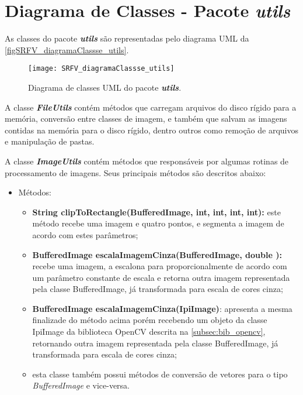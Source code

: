 \section{Diagrama de Classes - Pacote \textit{\textbf{utils}}}\label{sec:ituls}
As classes do pacote \textbf{\textit{utils}} são representadas pelo diagrama UML da \autoref{figSRFV_diagramaClassse_utils}. 

\begin{figure}[h]
	\centering
	\texttt{[image: SRFV\_diagramaClassse\_utils]}
	\caption{Diagrama de classes UML do pacote \textbf{\textit{utils}}.}
	\label{figSRFV_diagramaClassse_utils}
\end{figure}

A classe \textit{\textbf{FileUtils}} contém métodos que carregam arquivos do disco rígido para a memória, conversão entre classes de imagem, e também que salvam as imagens contidas na memória para o disco rígido, dentro outros como remoção de arquivos e manipulação de pastas.


A classe \textit{\textbf{ImageUtils}} contém métodos que responsáveis por algumas rotinas de processamento de imagens. Seus principais métodos são descritos abaixo:


\begin{itemize}	
	\item Métodos:
	\begin{itemize}
		\item \textbf{String clipToRectangle(BufferedImage, int, int, int, int):} este método recebe uma imagem e quatro pontos, e segmenta a imagem de acordo com estes parâmetros;
		
		\item \textbf{BufferedImage escalaImagemCinza(BufferedImage, double ):} recebe uma imagem, a escalona para proporcionalmente de acordo com um parâmetro constante de escala e retorna outra imagem representada pela classe BufferedImage, já transformada para escala de cores cinza;
		
		\item \textbf{BufferedImage escalaImagemCinza(IpiImage)}: apresenta a mesma finalizade do método acima porém recebendo um objeto da classe IpiImage da biblioteca OpenCV descrita na \autoref{subsec:bib_opencv}, retornando outra imagem representada pela classe BufferedImage, já transformada para escala de cores cinza;
		
		\item esta classe também possui métodos de conversão de vetores para o tipo \textit{BufferedImage }e vice-versa.
	\end{itemize}
\end{itemize}


